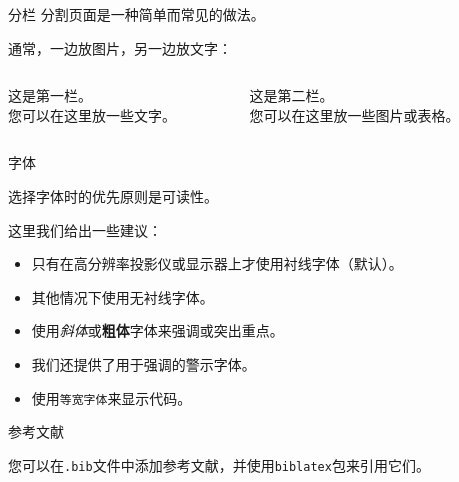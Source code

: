 \begin{frame}{分栏}
	分割页面是一种简单而常见的做法。

	通常，一边放图片，另一边放文字：
	
	\vspace{20pt}
	
	\begin{columns}
		\begin{column}{0.6\textwidth}
			这是第一栏。\\[10pt]
			您可以在这里放一些文字。
		\end{column}
		
		\begin{column}{0.3\textwidth}
			这是第二栏。\\[10pt]
			您可以在这里放一些图片或表格。
		\end{column}
	\end{columns}

\end{frame}

\begin{frame}{字体}
	
	选择字体时的优先原则是可读性。
	
	这里我们给出一些建议：
	\begin{itemize}
		\item 只有在高分辨率投影仪或显示器上才使用衬线字体（默认）。
		\item 其他情况下使用\textsf{无衬线字体}。
		\item 使用\textit{斜体}或\textbf{粗体}字体来强调或突出重点。
		\item 我们还提供了用于强调的\alert{警示}字体。
		\item 使用\texttt{等宽字体}来显示代码。
	\end{itemize}

\end{frame}

\begin{frame}{参考文献}

	您可以在\texttt{.bib}文件中添加参考文献，并使用\texttt{biblatex}包来引用它们\cite{liuAndyshiyiliuHKUSTBeamerTemplate2025}。

\end{frame}